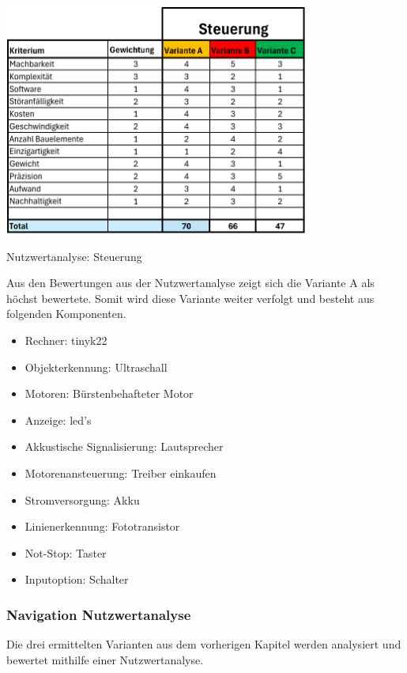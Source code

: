 \begin{table}[H]
\centering
\includegraphics[width=0.75\textwidth]{assets/Nutzwertanalyse-ET.pdf}
\caption{Nutzwertanalyse: Steuerung}
\label{table:nutzwert-ET}
\end{table}

Aus den Bewertungen aus der Nutzwertanalyse zeigt sich die Variante A als höchst bewertete. Somit wird diese Variante weiter verfolgt und besteht aus folgenden Komponenten.

\begin{itemize}
    \item Rechner: \gls{tinyk22}
    \item Objekterkennung: Ultraschall
    \item Motoren: Bürstenbehafteter Motor
    \item Anzeige: \acrshort{led}'s
    \item Akkustische Signalisierung: Lautsprecher
    \item Motorenansteuerung: Treiber einkaufen
    \item Stromversorgung: Akku
    \item Linienerkennung: Fototransistor
    \item Not-Stop: Taster
    \item Inputoption: Schalter
\end{itemize}

\subsubsection*{Navigation Nutzwertanalyse}

Die drei ermittelten Varianten aus dem vorherigen Kapitel werden analysiert und bewertet mithilfe einer Nutzwertanalyse.

